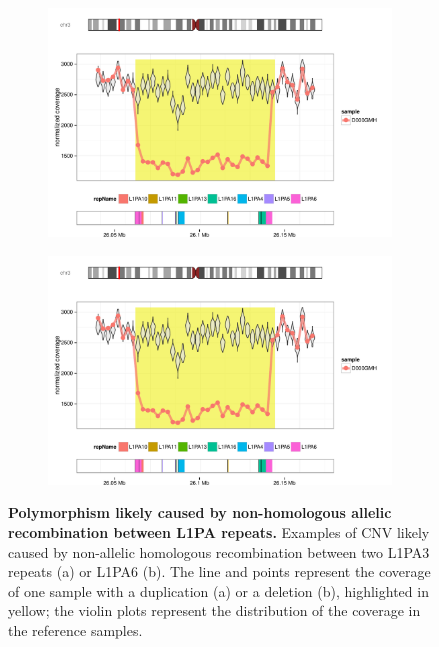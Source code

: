 \begin{figure}[htp]
  \centering
  \begin{subfigure}{.7\textwidth}
    \includegraphics[width=\textwidth,page=4]{figures/example-L1PA-NAHR.pdf}
    \caption{}
  \end{subfigure}
  
  \begin{subfigure}{.7\textwidth}
    \includegraphics[width=\textwidth,page=1]{figures/example-L1PA-NAHR.pdf}
    \caption{}
  \end{subfigure}
  \caption[Polymorphism likely caused by non-homologous allelic recombination between L1PA repeats.]{{\bf Polymorphism likely caused by non-homologous allelic recombination between L1PA repeats.} {\small Examples of CNV likely caused by non-allelic homologous recombination between two L1PA3 repeats (a) or L1PA6 (b). The line and points represent the coverage of one sample with a duplication (a) or a deletion (b), highlighted in yellow; the violin plots represent the distribution of the coverage in the reference samples. }}
  \label{fig:l1pa}
\end{figure}


